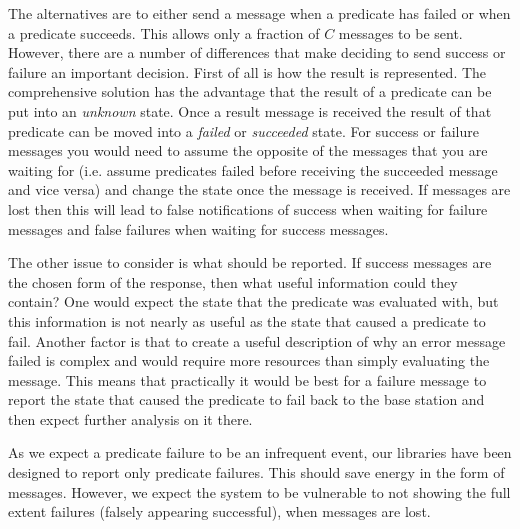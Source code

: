 The alternatives are to either send a message when a predicate has failed or when a predicate succeeds. This allows only a fraction of $C$ messages to be sent. However, there are a number of differences that make deciding to send success or failure an important decision. First of all is how the result is represented. The comprehensive solution has the advantage that the result of a predicate can be put into an \emph{unknown} state. Once a result message is received the result of that predicate can be moved into a \emph{failed} or \emph{succeeded} state. For success or failure messages you would need to assume the opposite of the messages that you are waiting for (i.e. assume predicates failed before receiving the succeeded message and vice versa) and change the state once the message is received. If messages are lost then this will lead to false notifications of success when waiting for failure messages and false failures when waiting for success messages.

The other issue to consider is what should be reported. If success messages are the chosen form of the response, then what useful information could they contain? One would expect the state that the predicate was evaluated with, but this information is not nearly as useful as the state that caused a predicate to fail. Another factor is that to create a useful description of why an error message failed is complex and would require more resources than simply evaluating the message. This means that practically it would be best for a failure message to report the state that caused the predicate to fail back to the base station and then expect further analysis on it there.

As we expect a predicate failure to be an infrequent event, our libraries have been designed to report only predicate failures. This should save energy in the form of messages. However, we expect the system to be vulnerable to not showing the full extent failures (falsely appearing successful), when messages are lost.

